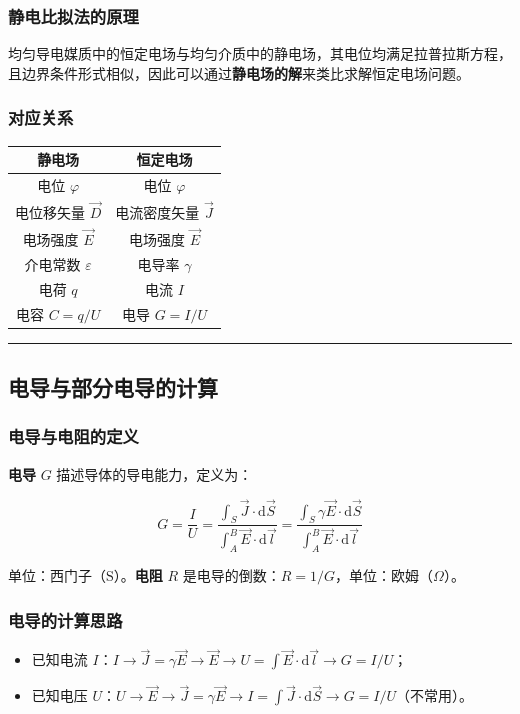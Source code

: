 \subsubsection{静电比拟法的原理}
均匀导电媒质中的恒定电场与均匀介质中的静电场，其电位均满足拉普拉斯方程，且边界条件形式相似，因此可以通过\textbf{静电场的解}来类比求解恒定电场问题。

\subsubsection{对应关系}
\begin{center}
\begin{tabular}{|c|c|}
\hline
\textbf{静电场} & \textbf{恒定电场} \\
\hline
电位 $\varphi$ & 电位 $\varphi$ \\
\hline
电位移矢量 $\vec{D}$ & 电流密度矢量 $\vec{J}$ \\
\hline
电场强度 $\vec{E}$ & 电场强度 $\vec{E}$ \\
\hline
介电常数 $\varepsilon$ & 电导率 $\gamma$ \\
\hline
电荷 $q$ & 电流 $I$ \\
\hline
电容 $C = q/U$ & 电导 $G = I/U$ \\
\hline
\end{tabular}
\end{center}

\vspace{0.8cm}\hrule\vspace{0.8cm}

\subsection{电导与部分电导的计算}
\subsubsection{电导与电阻的定义}
\textbf{电导} $G$ 描述导体的导电能力，定义为：
\begin{formulaBox}
\[
G = \frac{I}{U} = \frac{\int_S \vec{J} \cdot \mathrm{d}\vec{S}}{\int_A^B \vec{E} \cdot \mathrm{d}\vec{l}} = \frac{\int_S \gamma \vec{E} \cdot \mathrm{d}\vec{S}}{\int_A^B \vec{E} \cdot \mathrm{d}\vec{l}}
\]
\end{formulaBox}
单位：西门子（$\mathrm{S}$）。\textbf{电阻} $R$ 是电导的倒数：$R = 1/G$，单位：欧姆（$\Omega$）。

\subsubsection{电导的计算思路}
\begin{itemize}
    \item 已知电流 $I$：$I \to \vec{J} = \gamma \vec{E} \to \vec{E} \to U = \int \vec{E} \cdot \mathrm{d}\vec{l} \to G = I/U$；
    \item 已知电压 $U$：$U \to \vec{E} \to \vec{J} = \gamma \vec{E} \to I = \int \vec{J} \cdot \mathrm{d}\vec{S} \to G = I/U$（不常用）。
\end{itemize}

